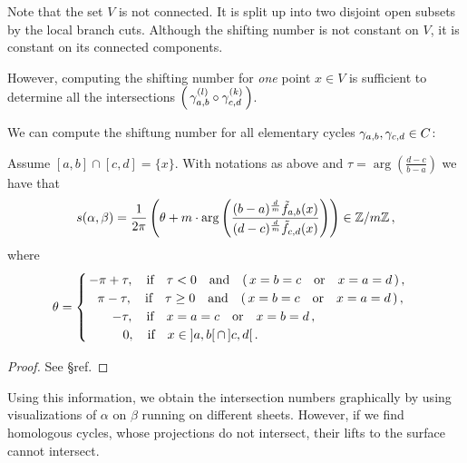 \documentclass[main.tex]{subfiles}
\begin{document}
	
	Note that the set $V$ is not connected. It is split up into two disjoint open subsets by the local branch cuts. Although the shifting number is not constant on $V$, it is constant on its
	connected components. 
	
	However, computing the shifting number for \emph{one} point $x \in V$ is sufficient to determine all the intersections $\left( \, \gamma_{a,b}^{(l)} \circ \gamma_{c,d}^{(k)} \,\right)$.
	 
	    We can compute the shiftung number for all elementary cycles $\gamma_{a,b}, \gamma_{c,d} \in C$:
    
    \begin{thm}\label{thm:shift_numb}
    Assume $[a,b] \cap [c,d] = \{x\}$. With notations as above and $\tau = \arg \left( \frac{d-c}{b-a} \right)$ we have that
     \begin{align}\label{eq:shift_numb}
       s(\alpha,\beta) = \frac{1}{2\pi} \left( \theta +  m \cdot \arg \left( \frac{(b-a)^{\frac{d}{m}} \tilde{f}_{a,b}(x)}{(d-c)^{\frac{d}{m}} \tilde{f}_{c,d}(x)} \right) \right) \in \mathbb{Z}/m\mathbb{Z}\,,
     \end{align}
     where
      \begin{align*}\theta = \begin{cases}
                              \, -\pi+\tau, \quad \text{if} \quad \tau < 0 \quad \text{and} \quad (\,x = b = c \quad \text{or} \quad x = a = d\,)\,,\\
                              \quad\! \pi-\tau, \quad \text{if} \quad \tau \ge 0 \quad \text{and} \quad (\,x = b = c \quad \text{or} \quad x = a = d\,)\,,\\
                              \hspace{0.7cm} -\tau, \quad \text{if} \quad x = a = c \quad \text{or} \quad x = b = d\,,\\
                              \hspace{1cm} 0, \quad \text{if} \quad x  \in \; ]a,b[ \,\cap\, ]c,d[\,.
                             \end{cases}
     \end{align*}
    \end{thm}
    \begin{proof}
     See \S \todo ref.
    \end{proof}

     Using this information, we obtain the intersection numbers graphically by using visualizations of $\alpha$ on $\beta$ running on different sheets.
     However, if we find homologous cycles, whose projections do not intersect, their lifts to the surface cannot intersect.
    
\end{document}
